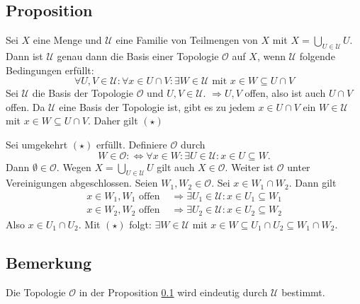 \subsection[Proposition: Bedingung, dass eine Familie von Teilmengen eine Topologie ist]{Proposition} %
\label{sub:116}
Sei $X$ eine Menge und $\mathcal{U} $ eine Familie von Teilmengen von $X$ mit $X = \bigcup_{U \in \mathcal{U} } U$. Dann ist $\mathcal{U} $ genau dann die Basis einer Topologie 
$\mathcal{O}$ auf $X$, wenn $\mathcal{U} $ folgende Bedingungen erfüllt:
\[
	\forall U,V \in \mathcal{U} : \forall x \in U \cap V : \exists W \in \mathcal{U}  \text{ mit } x \in W \subseteq U \cap V \tag*{$(\star)$}
\]
Sei $\mathcal{U} $ die Basis der Topologie $\mathcal{O} $ und $U,V \in \mathcal{U} $. $\Rightarrow U,V$ offen, also ist auch $U \cap V$ offen. Da $\mathcal{U} $ eine Basis
der Topologie ist, gibt es zu jedem $x \in U \cap V$ ein $W \in \mathcal{U} $ mit $x \in W \subseteq U \cap V$. Daher gilt $(\star)$  

Sei umgekehrt $(\star)$ erfüllt. Definiere $\mathcal{O} $ durch
\[
	W \in \mathcal{O} :\Longleftrightarrow \forall x \in W : \exists U \in \mathcal{U} : x \in U \subseteq W.  
\]
Dann $\emptyset \in \mathcal{O} $. Wegen $X = \bigcup_{U \in \mathcal{U} } U$ gilt auch $X \in \mathcal{O} $. Weiter ist $\mathcal{O} $ unter Vereinigungen abgeschlossen.
Seien $W_1, W_2 \in \mathcal{O} $. Sei $x \in W_1 \cap W_2$. Dann gilt
\begin{align*}
	x \in W_1, W_1 \text{ offen } &\Rightarrow  \exists U_1 \in \mathcal{U} : x \in U_1 \subseteq W_1 \\
	x \in W_2, W_2 \text{ offen } &\Rightarrow \exists U_2 \in \mathcal{U} : x \in U_2 \subseteq W_2 
\end{align*}
Also $x \in U_1 \cap U_2$. Mit $(\star)$ folgt: $\exists W \in \mathcal{U} $ mit $x \in W \subseteq U_1 \cap U_2 \subseteq W_1 \cap W_2$. \bewende

\subsection[Bemerkung: Eindeutigkeit von Proposition \ref{sub:116}]{Bemerkung} %
\label{sub:117}
Die Topologie $\mathcal{O}$ in der Proposition \ref{sub:116} wird eindeutig durch $\mathcal{U}$ bestimmt.

